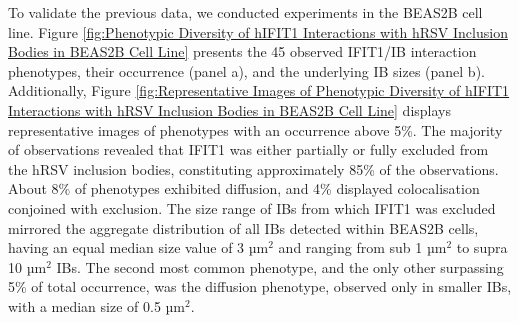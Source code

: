 To validate the previous data, we conducted experiments in the BEAS2B cell line. Figure \ref{fig:Phenotypic Diversity of hIFIT1 Interactions with hRSV Inclusion Bodies in BEAS2B Cell Line} presents the 45 observed IFIT1/IB interaction phenotypes, their occurrence (panel a), and the underlying IB sizes (panel b). Additionally, Figure \ref{fig:Representative Images of Phenotypic Diversity of hIFIT1 Interactions with hRSV Inclusion Bodies in BEAS2B Cell Line} displays representative images of phenotypes with an occurrence above 5\%. The majority of observations revealed that IFIT1 was either partially or fully excluded from the hRSV inclusion bodies, constituting approximately 85\% of the observations. About 8\% of phenotypes exhibited diffusion, and 4\% displayed colocalisation conjoined with exclusion. The size range of IBs from which IFIT1 was excluded mirrored the aggregate distribution of all IBs detected within BEAS2B cells, having an equal median size value of 3 \(\mbox{µm}^2\) and ranging from sub 1 \(\mbox{µm}^2\) to supra 10 \(\mbox{µm}^2\) IBs. The second most common phenotype, and the only other surpassing 5\% of total occurrence, was the diffusion phenotype, observed only in smaller IBs, with a median size of 0.5 \(\mbox{µm}^2\).

